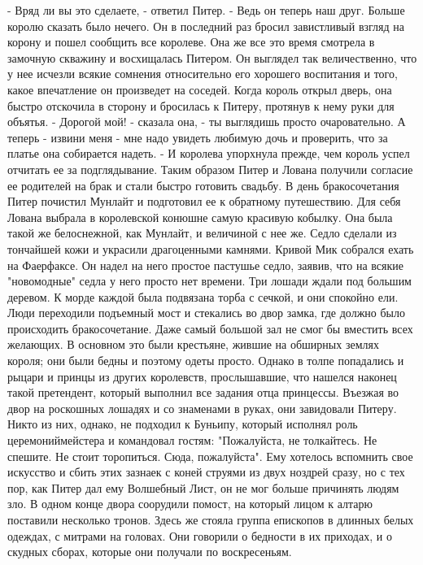     - Вряд ли вы это сделаете, - ответил Питер. - Ведь он теперь наш 
друг.
    Больше королю сказать было нечего. Он в последний раз бросил 
завистливый взгляд на корону и пошел сообщить все королеве.
    Она же все это время смотрела в замочную скважину и восхищалась 
Питером. Он выглядел так величественно, что у нее исчезли всякие 
сомнения относительно его хорошего воспитания и того, какое 
впечатление он произведет на соседей. Когда король открыл дверь, она 
быстро отскочила в сторону и бросилась к Питеру, протянув к нему руки 
для объятья.
    - Дорогой мой! - сказала она, - ты выглядишь просто очаровательно. 
А теперь - извини меня - мне надо увидеть любимую дочь и проверить, 
что за платье она собирается надеть. - И королева упорхнула прежде, 
чем король успел отчитать ее за подглядывание.
    Таким образом Питер и Лована получили согласие ее родителей на 
брак и стали быстро готовить свадьбу.
    В день бракосочетания Питер почистил Мунлайт и подготовил ее к 
обратному путешествию. Для себя Лована выбрала в королевской конюшне 
самую красивую кобылку. Она была такой же белоснежной, как Мунлайт, и 
величиной с нее же. Седло сделали из тончайшей кожи и украсили 
драгоценными камнями.
    Кривой Мик собрался ехать на Фаерфаксе. Он надел на него простое 
пастушье седло, заявив, что на всякие "новомодные" седла у него просто 
нет времени.
    Три лошади ждали под большим деревом. К морде каждой была 
подвязана торба с сечкой, и они спокойно ели.
    Люди переходили подъемный мост и стекались во двор замка, где 
должно было происходить бракосочетание. Даже самый большой зал не смог 
бы вместить всех желающих. В основном это были крестьяне, жившие на 
обширных землях короля; они были бедны и поэтому одеты просто. Однако 
в толпе попадались и рыцари и принцы из других королевств, 
прослышавшие, что нашелся наконец такой претендент, который выполнил 
все задания отца принцессы. Въезжая во двор на роскошных лошадях и со 
знаменами в руках, они завидовали Питеру.
    Никто из них, однако, не подходил к Буньипу, который исполнял роль 
церемониймейстера и командовал гостям: "Пожалуйста, не толкайтесь. Не 
спешите. Не стоит торопиться. Сюда, пожалуйста". Ему хотелось 
вспомнить свое искусство и сбить этих зазнаек с коней струями из двух 
ноздрей сразу, но с тех пор, как Питер дал ему Волшебный Лист, он не 
мог больше причинять людям зло.
    В одном конце двора соорудили помост, на который лицом к алтарю 
поставили несколько тронов. Здесь же стояла группа епископов в длинных 
белых одеждах, с митрами на головах. Они говорили о бедности в их 
приходах, и о скудных сборах, которые они получали по воскресеньям.
